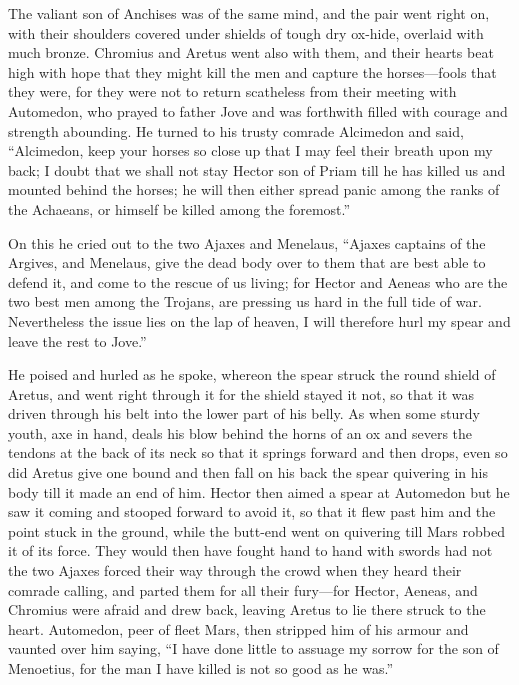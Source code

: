 The valiant son of Anchises was of the same mind, and the pair went right
on, with their shoulders covered under shields of tough dry ox-hide,
overlaid with much bronze. Chromius and Aretus went also with them, and
their hearts beat high with hope that they might kill the men and capture
the horses—fools that they were, for they were not to return
scatheless from their meeting with Automedon, who prayed to father Jove
and was forthwith filled with courage and strength abounding. He turned to
his trusty comrade Alcimedon and said, “Alcimedon, keep your horses so
close up that I may feel their breath upon my back; I doubt that we shall
not stay Hector son of Priam till he has killed us and mounted behind the
horses; he will then either spread panic among the ranks of the Achaeans,
or himself be killed among the foremost.”

On this he cried out to the two Ajaxes and Menelaus, “Ajaxes captains of
the Argives, and Menelaus, give the dead body over to them that are best
able to defend it, and come to the rescue of us living; for Hector and
Aeneas who are the two best men among the Trojans, are pressing us hard in
the full tide of war. Nevertheless the issue lies on the lap of heaven, I
will therefore hurl my spear and leave the rest to Jove.”

He poised and hurled as he spoke, whereon the spear struck the round
shield of Aretus, and went right through it for the shield stayed it not,
so that it was driven through his belt into the lower part of his belly.
As when some sturdy youth, axe in hand, deals his blow behind the horns of
an ox and severs the tendons at the back of its neck so that it springs
forward and then drops, even so did Aretus give one bound and then fall on
his back the spear quivering in his body till it made an end of him.
Hector then aimed a spear at Automedon but he saw it coming and stooped
forward to avoid it, so that it flew past him and the point stuck in the
ground, while the butt-end went on quivering till Mars robbed it of its
force. They would then have fought hand to hand with swords had not the
two Ajaxes forced their way through the crowd when they heard their
comrade calling, and parted them for all their fury—for Hector,
Aeneas, and Chromius were afraid and drew back, leaving Aretus to lie
there struck to the heart. Automedon, peer of fleet Mars, then stripped
him of his armour and vaunted over him saying, “I have done little to
assuage my sorrow for the son of Menoetius, for the man I have killed is
not so good as he was.”

